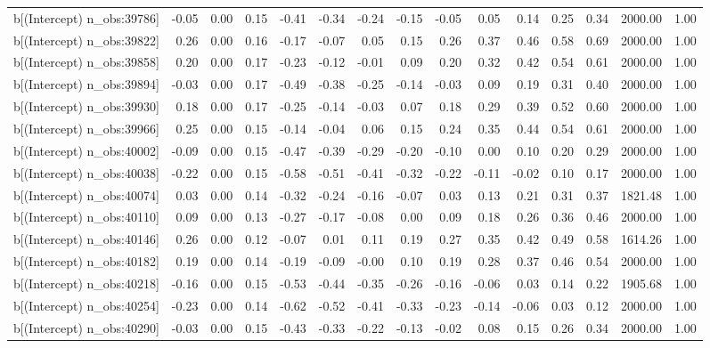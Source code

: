 \begin{table}[ht]
\begin{tabular}{rrrrrrrrrrrrrrr}
  b[(Intercept) n\_obs:39786] & -0.05 & 0.00 & 0.15 & -0.41 & -0.34 & -0.24 & -0.15 & -0.05 & 0.05 & 0.14 & 0.25 & 0.34 & 2000.00 & 1.00 \\ 
  b[(Intercept) n\_obs:39822] & 0.26 & 0.00 & 0.16 & -0.17 & -0.07 & 0.05 & 0.15 & 0.26 & 0.37 & 0.46 & 0.58 & 0.69 & 2000.00 & 1.00 \\ 
  b[(Intercept) n\_obs:39858] & 0.20 & 0.00 & 0.17 & -0.23 & -0.12 & -0.01 & 0.09 & 0.20 & 0.32 & 0.42 & 0.54 & 0.61 & 2000.00 & 1.00 \\ 
  b[(Intercept) n\_obs:39894] & -0.03 & 0.00 & 0.17 & -0.49 & -0.38 & -0.25 & -0.14 & -0.03 & 0.09 & 0.19 & 0.31 & 0.40 & 2000.00 & 1.00 \\ 
  b[(Intercept) n\_obs:39930] & 0.18 & 0.00 & 0.17 & -0.25 & -0.14 & -0.03 & 0.07 & 0.18 & 0.29 & 0.39 & 0.52 & 0.60 & 2000.00 & 1.00 \\ 
  b[(Intercept) n\_obs:39966] & 0.25 & 0.00 & 0.15 & -0.14 & -0.04 & 0.06 & 0.15 & 0.24 & 0.35 & 0.44 & 0.54 & 0.61 & 2000.00 & 1.00 \\ 
  b[(Intercept) n\_obs:40002] & -0.09 & 0.00 & 0.15 & -0.47 & -0.39 & -0.29 & -0.20 & -0.10 & 0.00 & 0.10 & 0.20 & 0.29 & 2000.00 & 1.00 \\ 
  b[(Intercept) n\_obs:40038] & -0.22 & 0.00 & 0.15 & -0.58 & -0.51 & -0.41 & -0.32 & -0.22 & -0.11 & -0.02 & 0.10 & 0.17 & 2000.00 & 1.00 \\ 
  b[(Intercept) n\_obs:40074] & 0.03 & 0.00 & 0.14 & -0.32 & -0.24 & -0.16 & -0.07 & 0.03 & 0.13 & 0.21 & 0.31 & 0.37 & 1821.48 & 1.00 \\ 
  b[(Intercept) n\_obs:40110] & 0.09 & 0.00 & 0.13 & -0.27 & -0.17 & -0.08 & 0.00 & 0.09 & 0.18 & 0.26 & 0.36 & 0.46 & 2000.00 & 1.00 \\ 
  b[(Intercept) n\_obs:40146] & 0.26 & 0.00 & 0.12 & -0.07 & 0.01 & 0.11 & 0.19 & 0.27 & 0.35 & 0.42 & 0.49 & 0.58 & 1614.26 & 1.00 \\ 
  b[(Intercept) n\_obs:40182] & 0.19 & 0.00 & 0.14 & -0.19 & -0.09 & -0.00 & 0.10 & 0.19 & 0.28 & 0.37 & 0.46 & 0.54 & 2000.00 & 1.00 \\ 
  b[(Intercept) n\_obs:40218] & -0.16 & 0.00 & 0.15 & -0.53 & -0.44 & -0.35 & -0.26 & -0.16 & -0.06 & 0.03 & 0.14 & 0.22 & 1905.68 & 1.00 \\ 
  b[(Intercept) n\_obs:40254] & -0.23 & 0.00 & 0.14 & -0.62 & -0.52 & -0.41 & -0.33 & -0.23 & -0.14 & -0.06 & 0.03 & 0.12 & 2000.00 & 1.00 \\ 
  b[(Intercept) n\_obs:40290] & -0.03 & 0.00 & 0.15 & -0.43 & -0.33 & -0.22 & -0.13 & -0.02 & 0.08 & 0.15 & 0.26 & 0.34 & 2000.00 & 1.00 \\ 

\end{tabular}
\end{table}
